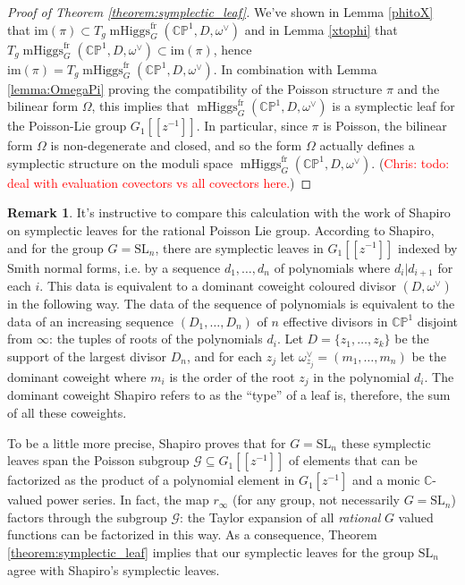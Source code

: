 \documentclass[11pt, oneside, reqno]{amsart}
\theoremstyle{definition} \newtheorem{definition}{Definition}[section]
\theoremstyle{definition} \newtheorem{remark}[definition]{Remark}
\theoremstyle{definition} \newtheorem{remarks}[definition]{Remarks}
\theoremstyle{definition} \newtheorem{question}[definition]{Question}
\theoremstyle{definition} \newtheorem*{note}{Note}
\theoremstyle{definition} \newtheorem{example}[definition]{Example}
\theoremstyle{definition} \newtheorem{examples}[definition]{Examples}
\newcommand{\bb}[1]{\mathbb{#1}}
\newcommand{\mr}[1]{\mathrm{#1}}
\newcommand{\mc}[1]{\mathcal{#1}}
\newcommand{\CC}{\mathbb{C}}
\newcommand{\SL}{\mathrm{SL}}
\newcommand{\sub}{\subseteq}
\DeclareMathOperator{\mhiggs}{mHiggs}
\newcommand{\fr}{\mathrm{fr}}
\newcommand{\chris}[1]{(\textcolor{red}{Chris: #1})}
\begin{document}
\begin{proof}[Proof of Theorem \ref{theorem:symplectic_leaf}]
We've shown in Lemma \ref{phitoX} that $\mathrm{im}(\pi) \subset T_{g} \mhiggs^\fr_G(\bb{CP}^1, D, \omega^\vee)$ and in Lemma \ref{xtophi} that $T_{g} \mhiggs^\fr_G(\bb{CP}^1, D, \omega^\vee) \subset \mathrm{im}(\pi)$, hence $\mr{im}(\pi) = T_{g} \mhiggs^\fr_G(\bb{CP}^1, D, \omega^\vee)$. In combination with Lemma \ref{lemma:OmegaPi} proving the compatibility of the Poisson structure $\pi$ and the bilinear form $\Omega$, this implies that $\mhiggs^\fr_G(\bb{CP}^1, D, \omega^\vee)$ is
a symplectic leaf for the Poisson-Lie group $G_1[[z^{-1}]]$. In particular, since $\pi$ is Poisson, the bilinear form $\Omega$ is non-degenerate and closed, and so the form $\Omega$ actually defines a symplectic structure on the moduli space $\mhiggs^\fr_G(\bb{CP}^1, D, \omega^\vee)$. \chris{todo: deal with evaluation covectors vs all covectors here.}
\end{proof}

\begin{remark} \label{shapiro_leaves_remark}
It's instructive to compare this calculation with the work of Shapiro \cite{Shapiro} on symplectic leaves for the rational Poisson Lie group.  According to Shapiro, and for the group $G = \SL_n$, there are symplectic leaves in $G_1[[z^{-1}]]$ indexed by Smith normal forms, i.e. by a sequence $d_1, \ldots, d_n$ of polynomials where $d_i | d_{i+1}$ for each $i$.  This data is equivalent to a dominant coweight coloured divisor $(D,\omega^\vee)$ in the following way.  The data of the sequence of polynomials is equivalent to the data of an increasing sequence $(D_1, \ldots, D_n)$ of $n$ effective divisors in $\bb{CP}^1$ disjoint from $\infty$: the tuples of roots of the polynomials $d_i$.  Let $D = \{z_1, \ldots, z_k\}$ be the support of the largest divisor $D_n$, and for each $z_j$ let $\omega^\vee_{z_j} = (m_1, \ldots, m_n)$ be the dominant coweight where $m_i$ is the order of the root $z_j$ in the polynomial $d_i$.  The dominant coweight Shapiro refers to as the ``type'' of a leaf is, therefore, the sum of all these coweights.

To be a little more precise, Shapiro proves that for $G = \SL_n$ these symplectic leaves span the Poisson subgroup $\mc G \sub G_1[[z^{-1}]]$ of elements that can be factorized as the product of a polynomial element in $G_1[z^{-1}]$ and a monic $\CC$-valued power series.  In fact, the map $r_\infty$ (for any group, not necessarily $G = \SL_n$) factors through the subgroup $\mc G$: the Taylor expansion of all \emph{rational} $G$ valued functions can be factorized in this way.  As a consequence, Theorem \ref{theorem:symplectic_leaf} implies that our symplectic leaves for the group $\SL_n$ agree with Shapiro's symplectic leaves.
\end{remark}
\end{document}
